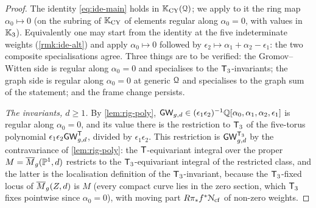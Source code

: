 \begin{proof}
The identity \eqref{eq:ide-main} holds in $\mathbb{K}_{\mathrm{CY}}(\mathcal{Q})$; we apply to it the ring map $\alpha_0\mapsto 0$ (on the subring of $\mathbb{K}_{\mathrm{CY}}$ of elements regular along $\alpha_0=0$, with values in $\mathbb{K}_{3}$). Equivalently one may start from the identity at the five indeterminate weights (\cref{rmk:ide-alt}) and apply $\alpha_0\mapsto 0$ followed by $\epsilon_2\mapsto\alpha_1+\alpha_2-\epsilon_1$: the two composite specialisations agree.  Three things are to be verified: the Gromov--Witten side is regular along $\alpha_0=0$ and specialises to the $\mathsf{T}_{3}$-invariants; the graph side is regular along $\alpha_0=0$ at generic $\mathcal{Q}$ and specialises to the graph sum of the statement; and the frame change persists.

\emph{The invariants, $d\geq 1$.} By \cref{lem:rig-poly}, $\mathsf{GW}_{g,d}\in(\epsilon_1\epsilon_2)^{-1}\mathbb{Q}[\alpha_0,\alpha_1,\alpha_2,\epsilon_1]$ is regular along $\alpha_0=0$, and its value there is the restriction to $\mathsf{T}_{3}$ of the five-torus polynomial $\epsilon_1\epsilon_2\mathsf{GW}^{\mathsf{T}}_{g,d}$, divided by $\epsilon_1\epsilon_2$. This restriction is $\mathsf{GW}^{\mathsf{T}_{3}}_{g,d}$ by the contravariance of \cref{lem:rig-poly}: the $\mathsf{T}$-equivariant integral over the proper $M=\overline{M}_g(\mathbb{P}^1,d)$ restricts to the $\mathsf{T}_{3}$-equivariant integral of the restricted class, and the latter is the localisation definition of the $\mathsf{T}_{3}$-invariant, because the $\mathsf{T}_{3}$-fixed locus of $\overline{M}_g(Z,d)$ is $M$ (every compact curve lies in the zero section, which $\mathsf{T}_{3}$ fixes pointwise since $\alpha_0=0$), with moving part $R\pi_*f^*\mathcal{N}_{\mathrm{cf}}$ of non-zero weights.


\end{proof}

